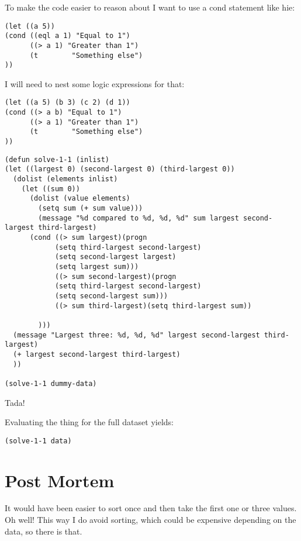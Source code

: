 \documentclass[11pt]{article}
\begin{document}
To make the code easier to reason about I want to use a cond statement like hie:
\begin{verbatim}
(let ((a 5))
(cond ((eql a 1) "Equal to 1")
      ((> a 1) "Greater than 1")
      (t        "Something else")
))
\end{verbatim}


I will need to nest some logic expressions for that:

\begin{verbatim}
(let ((a 5) (b 3) (c 2) (d 1))
(cond ((> a b) "Equal to 1")
      ((> a 1) "Greater than 1")
      (t        "Something else")
))
\end{verbatim}

\begin{verbatim}
(defun solve-1-1 (inlist)
(let ((largest 0) (second-largest 0) (third-largest 0))
  (dolist (elements inlist)
    (let ((sum 0))
      (dolist (value elements)
        (setq sum (+ sum value)))
        (message "%d compared to %d, %d, %d" sum largest second-largest third-largest)
      (cond ((> sum largest)(progn
            (setq third-largest second-largest)
            (setq second-largest largest)
            (setq largest sum)))
            ((> sum second-largest)(progn
            (setq third-largest second-largest)
            (setq second-largest sum)))
            ((> sum third-largest)(setq third-largest sum))

        )))
  (message "Largest three: %d, %d, %d" largest second-largest third-largest)
  (+ largest second-largest third-largest)
  ))

(solve-1-1 dummy-data)
\end{verbatim}

Tada!

Evaluating the thing for the full dataset yields:

\begin{verbatim}
(solve-1-1 data)
\end{verbatim}

\section{Post Mortem}
\label{sec:org212c206}
It would have been easier to sort once and then take the first one or three
values.
Oh well!
This way I do avoid sorting, which could be expensive depending on the data, so
there is that.
\end{document}

